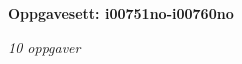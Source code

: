 \centerline{\bf Oppgavesett: i00751no-i00760no}
\vskip 10pt
\centerline{\it 10 oppgaver}\vskip 10pt
\vskip 10pt
